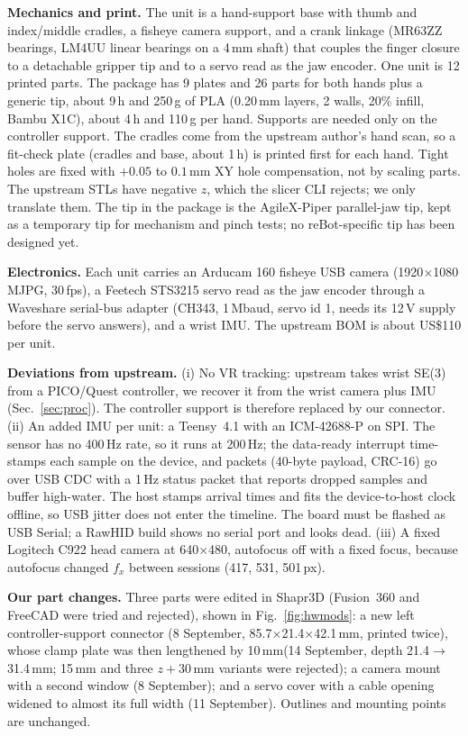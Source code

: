\documentclass[conference,10pt]{IEEEtran}
\newcommand{\mm}{\,mm\xspace}
\begin{document}
\textbf{Mechanics and print.} The unit is a hand-support base with thumb and index/middle cradles, a fisheye camera support,
and a crank linkage (MR63ZZ bearings, LM4UU linear bearings on a 4\mm shaft) that couples the finger closure to a detachable
gripper tip and to a servo read as the jaw encoder. One unit is 12 printed parts. The package has 9 plates and 26 parts for both hands
plus a generic tip, about 9\,h and 250\,g of PLA (0.20\mm layers, 2 walls, 20\% infill, Bambu X1C), about 4\,h and 110\,g per
hand. Supports are needed only on the controller support. The cradles come from the upstream author's hand scan, so a
fit-check plate (cradles and base, about 1\,h) is printed first for each hand. Tight holes are fixed with $+0.05$ to $0.1$\mm XY
hole compensation, not by scaling parts. The upstream STLs have negative $z$, which the slicer CLI rejects; we only translate
them. The tip in the package is the AgileX-Piper parallel-jaw tip, kept as a temporary tip for mechanism and pinch tests; no
reBot-specific tip has been designed yet.

\textbf{Electronics.} Each unit carries an Arducam 160\textdegree{} fisheye USB camera (1920$\times$1080 MJPG, 30\,fps), a
Feetech STS3215 servo read as the jaw encoder through a Waveshare serial-bus adapter (CH343, 1\,Mbaud, servo id 1, needs its
12\,V supply before the servo answers), and a wrist IMU. The upstream BOM is about US\$110 per unit.

\textbf{Deviations from upstream.} (i) No VR tracking: upstream takes wrist SE(3) from a PICO/Quest controller, we recover it from
the wrist camera plus IMU (Sec.~\ref{sec:proc}). The controller support is therefore replaced by our connector. (ii) An added
IMU per unit: a Teensy~4.1 with an ICM-42688-P on SPI. The sensor has no 400\,Hz rate, so it runs at 200\,Hz; the data-ready
interrupt time-stamps each sample on the device, and packets (40-byte payload, CRC-16) go over USB CDC with a 1\,Hz status
packet that reports dropped samples and buffer high-water. The host stamps arrival times and fits the device-to-host clock
offline, so USB jitter does not enter the timeline. The board must be flashed as USB Serial; a RawHID build shows no serial
port and looks dead. (iii) A fixed Logitech C922 head camera at 640$\times$480, autofocus off with a fixed focus, because
autofocus changed $f_x$ between sessions (417, 531, 501\,px).

\textbf{Our part changes.} Three parts were edited in Shapr3D (Fusion~360 and FreeCAD were tried and rejected), shown in
Fig.~\ref{fig:hwmods}: a new left controller-support connector (8 September, 85.7$\times$21.4$\times$42.1\mm, printed twice),
whose clamp plate was then lengthened by 10\mm (14 September, depth 21.4$\to$31.4\mm; 15\mm and three $z{+}30$\mm variants
were rejected); a camera mount with a second window (8 September); and a servo cover with a cable opening widened to almost
its full width (11 September). Outlines and mounting points are unchanged.
\end{document}
